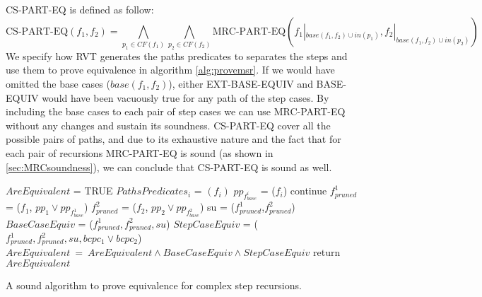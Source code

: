 CS-PART-EQ is defined as follow:
\begin{equation}
  \text{CS-PART-EQ}(f_1,f_2) = \bigwedge_{p_1\in CF(f_1)}\bigwedge_{p_2\in CF(f_2)}\text{MRC-PART-EQ}(f_1|_{base(f_1,f_2) \cup in(p_1)},f_2|_{base(f_1,f_2) \cup in(p_2)})
\end{equation}
We specify how RVT generates the paths predicates to separates the steps and use them to prove equivalence in algorithm \ref{alg:provemsr}. If we would have omitted the base cases ($base(f_1,f_2)$), either EXT-BASE-EQUIV and BASE-EQUIV would have been vacuously true for any path of the step cases. By including the base cases to each pair of step cases  we can use MRC-PART-EQ without any changes and sustain its soundness. CS-PART-EQ cover all the possible pairs of paths, and due to its exhaustive nature and the fact that for each pair of recursions MRC-PART-EQ is sound (as shown in \ref{sec:MRCsoundness}), we can conclude that CS-PART-EQ is sound as well.

\begin{algorithm}
\begin{minipage}{\linewidth}
\begin{algorithmic}[1]
    \State $AreEquivalent$ = TRUE
    \label{step:foreach_p}
	\State $PathsPredicates_i$ = $(f_i)$
	\State $pp_{f_{base}^i}$ = ($f_i$) 
	\EndFor
	 \label{step:skip_unfeasible}
	\State continue
	\EndIf
	\State $f_{pruned}^1$ = ($f_1$, $pp_1\lor pp_{f_{base}^1}$) 
	\label{step:assmp1}
	\State $f_{pruned}^2$ = ($f_2$, $pp_2 \lor pp_{f_{base}^2}$) 
	\label{step:assmp2}
	\State su = ($f_{pruned}^1$,$f_{pruned}^2$)
	\State $BaseCaseEquiv$ = ($f_{pruned}^1,f_{pruned}^2,su$) 
	\State $StepCaseEquiv$ = 	($f_{pruned}^1,f_{pruned}^2,su,bcpc_1\lor bcpc_2$)\label{step:provestepincs}
	\State $AreEquivalent\ =\ AreEquivalent \wedge BaseCaseEquiv \wedge StepCaseEquiv$ 
	\EndFor
	\State return $AreEquivalent$
	\EndFunction
\end{algorithmic}
\end{minipage}
\caption{A sound algorithm to prove equivalence for complex step recursions.}
\label{alg:provemsr}
\end{algorithm}


